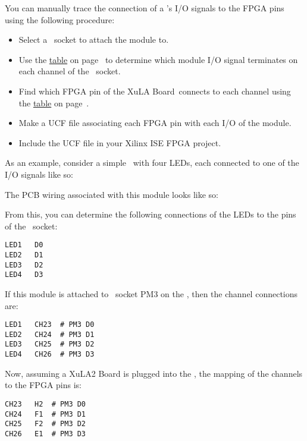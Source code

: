 \documentclass[letterpaper,11pt,oneside]{memoir}
\newcommand{\xula}{XuLA Board}
\begin{document}
You can manually trace the connection of a \digpmod's I/O signals to the
FPGA pins using the following procedure:

\begin{itemize}
\item Select a \digpmod\ socket to attach the module to.
\item Use the \hyperref[tab:ChanneltoPMODConnections]{table} on page~\pageref{tab:ChanneltoPMODConnections} to determine 
	which module I/O signal terminates on each channel of the \digpmod\ socket.
\item Find which FPGA pin of the \xula\ connects to each channel using the
	\hyperref[tab:ChanneltoFPGAConnections]{table} on page~\pageref{tab:ChanneltoFPGAConnections}.
\item Make a UCF file associating each FPGA pin with each I/O of the module.
\item Include the UCF file in your Xilinx ISE FPGA project.
\end{itemize}

\pagebreak %

As an example, consider a simple \digpmod\ with four LEDs, each
connected to one of the I/O signals like so:


The PCB wiring associated with this module looks like so:


From this, you can determine the following connections of the LEDs to the pins
of the \digpmod\ socket:

\begin{lstlisting}
LED1   D0
LED2   D1
LED3   D2
LED4   D3
\end{lstlisting}

If this module is attached to \digpmod\ socket PM3 on the \product, 
then the channel connections are:

\begin{lstlisting}
LED1   CH23  # PM3 D0
LED2   CH24  # PM3 D1
LED3   CH25  # PM3 D2
LED4   CH26  # PM3 D3
\end{lstlisting}

Now, assuming a XuLA2 Board is plugged into the \product, the mapping of
the channels to the FPGA pins is:

\begin{lstlisting}
CH23   H2  # PM3 D0
CH24   F1  # PM3 D1
CH25   F2  # PM3 D2
CH26   E1  # PM3 D3
\end{lstlisting}
\end{document}
